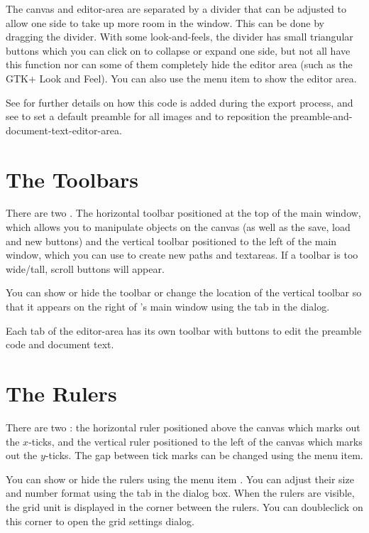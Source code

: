 The \gls{canvas} and \gls{editor-area} are separated by a divider that can be adjusted to
allow one side to take up more room in the window. This can be done
by dragging the divider.  With some \glspl{look-and-feel}, the
divider has small triangular buttons which you can click on to
collapse or expand one side, but not all have this function nor can
some of them completely hide the editor area (such as the GTK+
Look and Feel).  You can also use the  menu
item to show the editor area.

See  for further details on how this
code is added during the export process, and
see  to set a default preamble
for all images and to reposition the \gls{preamble-and-document-text-editor-area}.

\section{The Toolbars}\label{sec:thetoolbars}

There are two .  The horizontal toolbar positioned at
the top of the main window, which allows you to manipulate
\glspl{object} on the \gls{canvas} (as well as the save, load and
new buttons) and the vertical toolbar positioned to the left of the
main window, which you can use to create new \glspl{path} and
\glspl{textarea}. If a toolbar is too wide\slash tall, scroll buttons will
appear.

You can show or hide the \gls{toolbar} or change the location of
the vertical toolbar so that it appears on the right of \FlowframTk's
main window using the  tab in the
 dialog.

Each tab of the \gls{editor-area} has its own
toolbar with buttons to edit the preamble code and document text.


\section{The Rulers}\label{sec:therulers}

There are two : the horizontal ruler
positioned above the \gls{canvas} which marks out the $x$-ticks, and
the vertical ruler positioned to the left of the \gls*{canvas} which
marks out the $y$-ticks. The gap between tick marks can be changed
using the  menu item.

You can show or hide the \glspl*{ruler} using the menu item
.  You can adjust their size and number format
using the  tab in the 
dialog box. When the rulers are visible, the grid unit is displayed
in the corner between the rulers. You can \gls{doubleclick} on this
corner to open the grid settings dialog.

